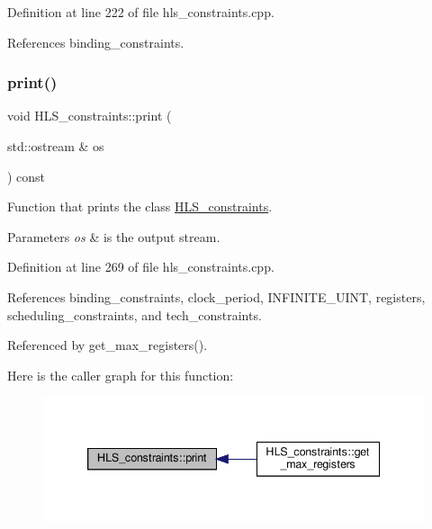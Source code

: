 Definition at line 222 of file hls\+\_\+constraints.\+cpp.



References binding\+\_\+constraints.

\mbox{\label{classHLS__constraints_a5d60dce734c42d7f7a659195b5883044}} 
\subsubsection{\texorpdfstring{print()}{print()}}
{\footnotesize\ttfamily void H\+L\+S\+\_\+constraints\+::print (\begin{DoxyParamCaption}\item[{std\+::ostream \&}]{os }\end{DoxyParamCaption}) const}



Function that prints the class \hyperlink{classHLS__constraints}{H\+L\+S\+\_\+constraints}. 


\begin{DoxyParams}{Parameters}
{\em os} & is the output stream. \\
\hline
\end{DoxyParams}


Definition at line 269 of file hls\+\_\+constraints.\+cpp.



References binding\+\_\+constraints, clock\+\_\+period, I\+N\+F\+I\+N\+I\+T\+E\+\_\+\+U\+I\+NT, registers, scheduling\+\_\+constraints, and tech\+\_\+constraints.



Referenced by get\+\_\+max\+\_\+registers().

Here is the caller graph for this function\+:
\nopagebreak
\begin{figure}[H]
\begin{center}
\leavevmode
\includegraphics[width=339pt]{dd/d96/classHLS__constraints_a5d60dce734c42d7f7a659195b5883044_icgraph}
\end{center}
\end{figure}
\mbox{\label{classHLS__constraints_abd387f72baf392a410dcfba2995c0ef8}} 
